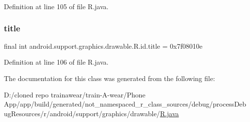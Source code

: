 Definition at line 105 of file R.\+java.

\mbox{\label{classandroid_1_1support_1_1graphics_1_1drawable_1_1_r_1_1id_ae4c46d15d4cdd1b6504115837b34d591}} 
\subsubsection{\texorpdfstring{title}{title}}
{\footnotesize\ttfamily final int android.\+support.\+graphics.\+drawable.\+R.\+id.\+title = 0x7f08010e\hspace{0.3cm}{\ttfamily [static]}}



Definition at line 106 of file R.\+java.



The documentation for this class was generated from the following file\+:\begin{DoxyCompactItemize}
\item 
D\+:/cloned repo trainawear/train-\/\+A-\/wear/\+Phone App/app/build/generated/not\+\_\+namespaced\+\_\+r\+\_\+class\+\_\+sources/debug/process\+Debug\+Resources/r/android/support/graphics/drawable/\mbox{\hyperlink{process_debug_resources_2r_2android_2support_2graphics_2drawable_2_r_8java}{R.\+java}}\end{DoxyCompactItemize}
